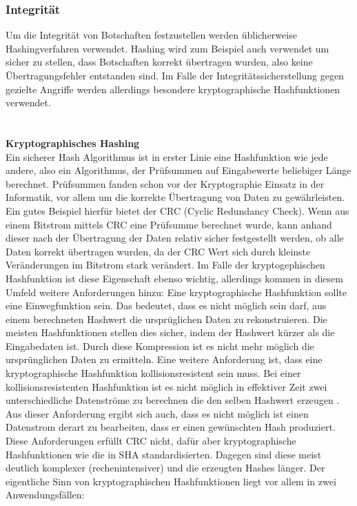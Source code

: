 \documentclass[13pt,a4paper,bibliography=totocnumbered,listof=totocnumbered]{scrartcl}
\begin{document}
\subsubsection{Integrität}
Um die Integrität von Botschaften festzustellen werden üblicherweise Hashingverfahren verwendet. Hashing wird zum Beispiel auch verwendet um sicher zu stellen, dass Botschaften korrekt übertragen wurden, also keine Übertragungsfehler entstanden sind. Im Falle der Integritätssicherstellung gegen gezielte Angriffe werden allerdings besondere kryptographische Hashfunktionen verwendet.\\
 \cite[S. 15]{48}  \cite[S. 2]{42}\\
 \pagebreak
\\\textbf{Kryptographisches Hashing}\\
Ein sicherer Hash Algorithmus ist in erster Linie eine Hashfunktion wie jede andere, also ein Algorithmus, der Prüfsummen auf Eingabewerte beliebiger Länge berechnet. Prüfsummen fanden schon vor der Kryptographie Einsatz in der Informatik, vor allem um die korrekte Übertragung von Daten zu gewährleisten. Ein gutes Beispiel hierfür bietet der CRC (Cyclic Redundancy Check). Wenn aus einem Bitstrom mittels CRC eine Prüfsumme berechnet wurde, kann anhand dieser nach der Übertragung der Daten relativ sicher festgestellt werden, ob alle Daten korrekt übertragen wurden, da der CRC Wert sich durch kleinste Veränderungen im Bitstrom stark verändert. Im Falle der kryptogephischen Hashfunktion ist diese Eigenschaft ebenso wichtig, allerdings kommen  in diesem Umfeld weitere Anforderungen hinzu: Eine kryptographische Hashfunktion sollte eine Einwegfunktion sein. Das bedeutet, dass es nicht möglich sein darf, aus einem berechneten Hashwert die ursprüglichen Daten zu rekonstruieren. Die meisten Hashfunktionen stellen dies sicher, indem der Hashwert kürzer als die Eingabedaten ist. Durch diese Kompression ist es nicht mehr möglich die ursprünglichen Daten zu ermitteln. Eine weitere Anforderung ist, dass eine kryptographische Hashfunktion kollisionsresistent sein muss. Bei einer kollisionsresistenten Hashfunktion ist es nicht möglich in effektiver Zeit zwei unterschiedliche Datenströme zu berechnen die den selben Hashwert erzeugen \cite[S. 4]{12}. Aus dieser Anforderung ergibt sich auch, dass es nicht möglich ist einen Datenstrom derart zu bearbeiten, dass er einen gewünschten Hash produziert. Diese Anforderungen erfüllt CRC nicht, dafür aber kryptographische Hashfunktionen wie die in SHA standardisierten. Dagegen sind diese meist deutlich komplexer (rechenintensiver) und die erzeugten Hashes länger. Der eigentliche Sinn von kryptographischen Hashfunktionen liegt vor allem in zwei Anwendungsfällen:\\
\end{document}
